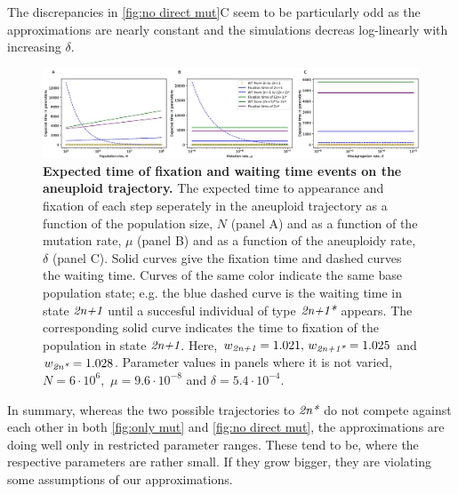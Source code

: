 \documentclass[12pt]{extarticle}
\newcommand{\anwt}{\emph{2n+1}}
\newcommand{\eumt}{\emph{2n*}}
\newcommand{\anmt}{\emph{2n+1*}}
\begin{document}
  The discrepancies in \cref{fig:no direct mut}C seem to be particularly odd as the approximations are nearly constant and the simulations decreas log-linearly with increasing $\delta$. 
  
  
 \begin{figure}[h!]
 \includegraphics[width=1\textwidth]{../figures/figgrid_fixT_vs_waitT.jpg}
 \caption{\textbf{Expected time of fixation and waiting time events on the aneuploid trajectory.}
  The expected time to appearance and fixation of each step seperately in the aneuploid trajectory as a function of the population size, $N$ (panel A) and as a function of the mutation rate, $\mu$ (panel B) and as a function of the aneuploidy rate, $\delta$ (panel C). Solid curves give the fixation time and dashed curves the waiting time. Curves of the same color indicate the same base population state;  e.g. the blue dashed curve is the waiting time in state $\anwt$ until a succesful individual of type $\anmt$ appears. The corresponding solid curve indicates the time to fixation of the population in state $\anwt$. Here, $w_\anwt=1.021,\,   w_\anmt=1.025$ and $w_\eumt=1.028$. Parameter values in panels where it is not varied, $N=6\cdot 10^6$,\, $\mu=9.6\cdot 10^{-8}$ and $\delta=5.4\cdot 10^{-4}$.  }
 \label{fig:fixT vs waitT}
 \end{figure}

In summary, whereas the two possible trajectories to $\eumt$ do not compete against each other in both \cref{fig:only mut} and \cref{fig:no direct mut}, the approximations are doing well only in restricted parameter ranges. These tend to be, where the respective parameters are rather small. If they grow bigger, they are violating some assumptions of our approximations.
 

 
 


\end{document}
